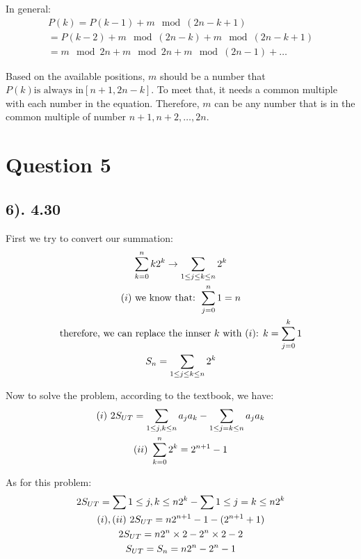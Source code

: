 \documentclass[12pt]{article}
\newcommand{\RNum}[1]{\uppercase\expandafter{\romannumeral #1\relax}}
\begin{document}
In general:
\begin{gather*}
    P(k) = P(k-1) + m \mod {(2n-k+1)} \\
    = P(k-2) + m \mod {(2n-k)} + m \mod {(2n-k+1)} \\
    = m \mod 2n + m \mod 2n + m \mod {(2n-1)} + \ldots
\end{gather*}

Based on the available positions, $m$ should be a number that $P(k) \text{is always in} [n+1, 2n-k]$. To meet that, it needs a common multiple with each number
in the equation. Therefore, $m$ can be any number that is in the common multiple of number $n+1, n+2, \ldots, 2n$.

\section*{Question 5}
\subsection*{6). 4.30}
First we try to convert our summation:
\begin{gather*}
    \sum_{k=0}^n k2^k \to \sum_{1 \leq j \leq k \leq n } 2^k \\
    \text{($\RNum{1}$) we know that: } \sum_{j=0}^n 1 = n \\
    \text{therefore, we can replace the innser $k$ with ($\RNum{1}$): } k = \sum_{j=0}^k 1 \\
    S_{n} = \sum_{1 \leq j \leq k \leq n} 2^k
\end{gather*}

Now to solve the problem, according to the textbook, we have:
\begin{gather*}
    \text{$(\RNum{1})$ } 2S_{UT} = \sum_{1 \leq j,k \leq n} a_{j}a_{k} - \sum_{1 \leq j=k \leq n} a_{j}a_{k} \\
    \text{$(\RNum{2})$ } \sum_{k=0}^n 2^k = 2^{n+1} - 1
\end{gather*}

As for this problem:
\begin{gather*}
    2S_{UT} = \sum{1 \leq j,k \leq n} 2^k - \sum{1 \leq j=k \leq n} 2^k \\
    \text{$(\RNum{1}), (\RNum{2})$ } 2S_{UT} = n2^{n+1} - 1 - (2^{n+1} + 1) \\
    2S_{UT} = n2^{n} \times 2 - 2^n \times 2 - 2 \\
    S_{UT} = S_{n} = n2^{n} - 2^n - 1 
\end{gather*}
\end{document}
